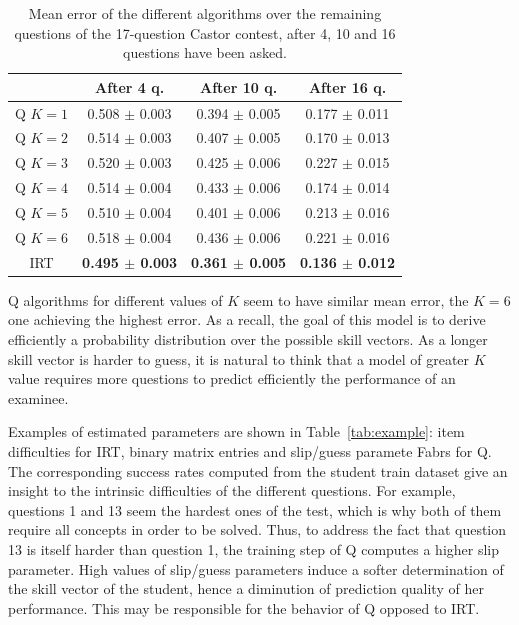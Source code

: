 \documentclass{sig-alternate}
\begin{document}
\begin{table}
\small\centering\begin{tabular}{@{}c|ccc@{}}
& After 4 q. & After 10 q. & After 16 q.\\
\hline
Q $K = 1$ & 0.508 $\pm$ 0.003 & 0.394 $\pm$ 0.005 & 0.177 $\pm$ 0.011 \\
Q $K = 2$ & 0.514 $\pm$ 0.003 & 0.407 $\pm$ 0.005 & 0.170 $\pm$ 0.013 \\
Q $K = 3$ & 0.520 $\pm$ 0.003 & 0.425 $\pm$ 0.006 & 0.227 $\pm$ 0.015 \\
Q $K = 4$ & 0.514 $\pm$ 0.004 & 0.433 $\pm$ 0.006 & 0.174 $\pm$ 0.014 \\
Q $K = 5$ & 0.510 $\pm$ 0.004 & 0.401 $\pm$ 0.006 & 0.213 $\pm$ 0.016 \\
Q $K = 6$ & 0.518 $\pm$ 0.004 & 0.436 $\pm$ 0.006 & 0.221 $\pm$ 0.016 \\
IRT & \textbf{0.495 $\pm$ 0.003} & \textbf{0.361 $\pm$ 0.005} & \textbf{0.136 $\pm$ 0.012} \\
\end{tabular}
\caption{Mean error of the different algorithms over the remaining questions of the 17-question Castor contest, after 4, 10 and 16 questions have been asked.}
\label{tab:error}
\end{table}

Q algorithms for different values of $K$ seem to have similar mean error, the $K = 6$ one achieving the highest error. As a recall, the goal of this model is to derive efficiently a probability distribution over the possible skill vectors. As a longer skill vector is harder to guess, it is natural to think that a model of greater $K$ value requires more questions to predict efficiently the performance of an examinee.

Examples of estimated parameters are shown in Table~\ref{tab:example}: item difficulties for IRT, binary matrix entries and slip/guess paramete	Fabrs for Q. The corresponding success rates computed from the student train dataset give an insight to the intrinsic difficulties of the different questions. For example, questions 1 and 13 seem the hardest ones of the test, which is why both of them require all concepts in order to be solved. Thus, to address the fact that question 13 is itself harder than question 1, the training step of Q computes a higher slip parameter. High values of slip/guess parameters induce a softer determination of the skill vector of the student, hence a diminution of prediction quality of her performance. This may be responsible for the behavior of Q opposed to IRT.
\end{document}

